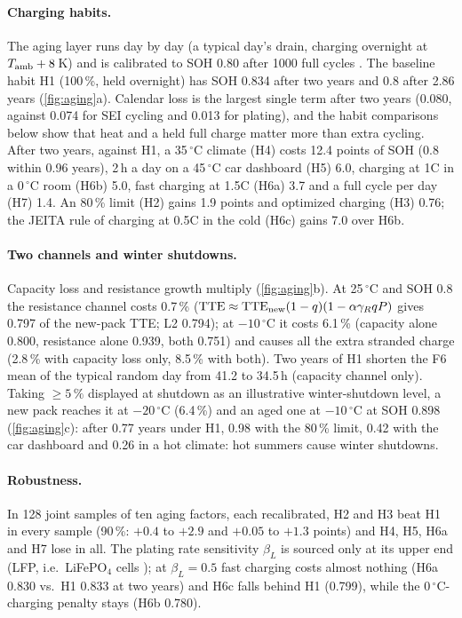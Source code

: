 \paragraph{Charging habits.} The aging layer runs day by day (a typical day's drain, charging overnight at
$T_{\mathrm{amb}}+8$\,K) and is calibrated to SOH 0.80 after 1000 full cycles \cite{AP-BATT,GOOG}. The baseline habit H1
(100\,\%, held overnight) has SOH 0.834 after two years and 0.8 after 2.86 years (\cref{fig:aging}a). Calendar
loss is the largest single term after two years (0.080, against 0.074 for SEI cycling and 0.013 for plating), and
the habit comparisons below show that heat and a held full charge matter more than extra cycling. After two
years, against H1, a 35\,$^\circ$C climate (H4) costs 12.4 points of SOH (0.8 within 0.96 years), 2\,h a day on a
45\,$^\circ$C car dashboard (H5) 6.0, charging at 1C in a 0\,$^\circ$C room (H6b) 5.0, fast charging at 1.5C (H6a)
3.7 and a full cycle per day (H7) 1.4. An 80\,\% limit (H2) gains 1.9 points and optimized charging (H3)
\cite{AP-OBC,SAM} 0.76; the JEITA rule \cite{TI-JEITA} of charging at 0.5C in the cold (H6c) gains 7.0 over H6b.

\paragraph{Two channels and winter shutdowns.} Capacity loss and resistance growth multiply (\cref{fig:aging}b).
At 25\,$^\circ$C and SOH 0.8 the resistance channel costs 0.7\,\%
($\mathrm{TTE}\approx\mathrm{TTE}_{\mathrm{new}}(1-q)(1-\alpha\gamma_RqP)$ gives 0.797 of the new-pack TTE; L2 0.794); at
$-10\,^\circ$C it costs 6.1\,\% (capacity alone 0.800, resistance alone 0.939, both 0.751) and causes all the
extra stranded charge (2.8\,\% with capacity loss only, 8.5\,\% with both). Two years of H1 shorten the F6 mean of
the typical random day from 41.2 to 34.5\,h (capacity channel only). Taking $\ge5\,\%$ displayed at shutdown as an
illustrative winter-shutdown level, a new pack reaches it at $-20\,^\circ$C (6.4\,\%) and an aged one at
$-10\,^\circ$C at SOH 0.898 (\cref{fig:aging}c): after 0.77 years under H1, 0.98 with the 80\,\% limit, 0.42 with
the car dashboard and 0.26 in a hot climate: hot summers cause winter shutdowns.

\paragraph{Robustness.} In 128 joint samples of ten aging factors, each recalibrated, H2 and H3 beat H1 in every
sample (90\,\%: $+0.4$ to $+2.9$ and $+0.05$ to $+1.3$ points) and H4, H5, H6a and H7 lose in all. The
plating rate sensitivity $\beta_L$ is sourced only at its upper end (LFP, i.e.\ LiFePO$_4$ cells \cite{SCM18}); at
$\beta_L=0.5$ fast charging costs almost nothing (H6a 0.830 vs.\ H1 0.833 at two years) and H6c falls behind H1
(0.799), while the 0\,$^\circ$C-charging penalty stays (H6b 0.780).
